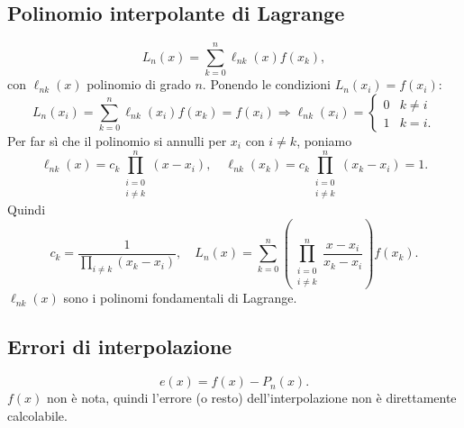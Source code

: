 \documentclass[11pt,a4paper]{article}
\newcommand{\pagina}[1]{\clearpage}
\begin{document}
\subsection*{Polinomio interpolante di Lagrange}
\[L_n(x)=\sum_{k=0}^n\ell_{nk}(x)f(x_k),\]
con $\ell_{nk}(x)$ polinomio di grado $n$. Ponendo le condizioni $L_n(x_i)=f(x_i)$:
\[L_n(x_i)=\sum_{k=0}^n\ell_{nk}(x_i)f(x_k)=f(x_i)\Longrightarrow\ell_{nk}(x_i)=\begin{cases}0&k\ne i\\1&k=i.\end{cases}\]
Per far sì che il polinomio si annulli per $x_i$ con $i\ne k$, poniamo
\[\ell_{nk}(x)=c_k\prod_{\substack{i=0\\i\ne k}}^n(x-x_i),\quad \ell_{nk}(x_k)=c_k\prod_{\substack{i=0\\i\ne k}}^n(x_k-x_i)=1.\]
Quindi
\[c_k=\frac1{\prod_{i\ne k}(x_k-x_i)},\quad\boxed{L_n(x)=\sum_{k=0}^n\left(\prod_{\substack{i=0\\i\ne k}}^n\frac{x-x_i}{x_k-x_i}\right)f(x_k)}.\]
$\ell_{nk}(x)$ sono i polinomi fondamentali di Lagrange.
\pagina{30}\subsection*{Errori di interpolazione}
\[e(x)=f(x)-P_n(x).\]
$f(x)$ non è nota, quindi l'errore (o resto) dell'interpolazione non è direttamente calcolabile.
\end{document}
